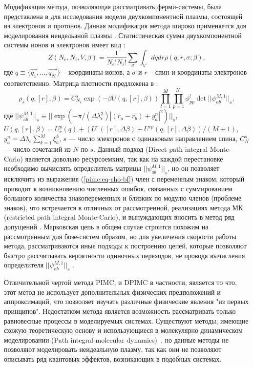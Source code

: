 Модификация метода, позволяющая рассматривать ферми-системы, была представлена в \cite{filinov1975}
для исследования модели двухкомпонентной плазмы, состоящей из электронов и протонов. Данная модификация метода широко применяется для моделирования неидельаной плазмы \cite{binder1996monte, kalman1998strongly, berne1998classical, filinov2003plasma, filinov2004thermodynamic}. 
Статистическая сумма двухкомпонентной системы ионов и электронов имеет вид \cite{feiman2013}: 
\begin{equation}
\label{pinc:eq-fermi-Z}
	Z(N_e, N_i, V, \beta) = \frac{1}{N_e!N_i!} \sum_\sigma \int_V dq dr \rho(q,r, \sigma; \beta),
\end{equation}
где $q \equiv \{\vec{q_1}, \dots, \vec{q_{N_i}}\}$ -- координаты ионов, а $\sigma$ и $r$ -- спин и координаты электронов соответственно.
Матрица плотности предложена в \cite{filinov1975high, filinov1976influence}:
\begin{equation}
\label{pimc:eq-rho-fermi}
\rho_s (q,[r],\beta)=C_{N_e}^s \exp(-\beta U(q, [r], \beta)) \prod_{l=1}^{M} \prod_{p=1}^{N_e} \phi^l_{pp}\det||\psi_{ab}^{M,1}||_s,
\end{equation}
где $|| \psi_{ab}^{M,1} ||_s \equiv || \exp(-\pi /  (\Delta \lambda_e^2) |(r_a - r_b) + y_a^n|^2)||_s$, \newline $U(q,[r],\beta)=U_c^p(q) + (U^e([r],\Delta\beta) + U^{ep}(q, [r], \Delta\beta))/(M+1)$, 
$y^n_a=\Delta\lambda_e\sum_{k=1}^{M}\xi_a^k$, $s$ --- число электронов с одинаковым направлением спина, $C^s_N$ --- число сочетаний из $N$ по $s$. 
Данный подход (Direct path integral Monte-Carlo) является довольно ресурсоемким, так как на каждой перестановке необходимо вычислять определитель матрицы $||\psi_{ab}^{M,1}||_s$, но он позволяет исключить из выражения (\ref{pimc:eq-rho-bf}) член с переменным знаком, который приводит к возникновению численных ошибок, связанных с суммированием большого количества знакопеременных и близких по модулю членов (проблеме знаков), что встречается в отличных от рассмотренной, реализациях метода МК (restricted path integral Monte-Carlo), и вынуждающих вносить в метод ряд допущений \cite{binder1996monte, ceperley1995path, militzer2000variational, militzer2000path}. 
Марковская цепь в общем случае строится похожим на рассмотренным для бозе-систем образом, но для увеличения скорости работы метода, рассматриваются иные подходы к построению цепей, которые позволяют быстро рассчитывать вероятности одиночных переходов, не проводя вычисления определителя $||\psi_{ab}^{M,1}||_s$ \cite{Zamalin77}. 

Отличительной чертой метода PIMC, и DPIMC в частности, является то что, этот метод не использует дополнительных физических предположений и аппроксимаций, что позволяет изучать различные физические явления "из первых принципов". Недостатком метода является возможность рассматривать только равновесные процессы в моделируемых системах. Существуют методы, имеющие схожую теоретическую основу и использующиеся в молекулярно динамическом моделировании (Path integral molecular dynamics)~\cite{marx1996ab, cao1996adiabatic}, но данные методы не позволяют моделировать неидеальную плазму, так как они не позволяют описывать ряд квантовых эффектов, возникающих в подобных системах.

 

